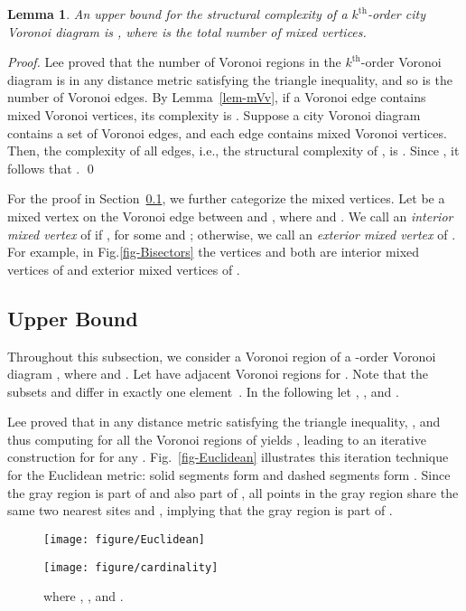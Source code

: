 \documentclass[11pt]{llncs}
\newtheorem{Lemma}{Lemma}
\newcommand{\kth}{\ensuremath{k^{\mathrm{th}}}\xspace}
\newcommand{\kthorder}{\kth-order\xspace}
\begin{document}
\newcommand{\lemmixuppertext}{An upper bound for the structural complexity of a \kthorder city Voronoi diagram 
is , where  is the total number of mixed vertices.
}

\begin{Lemma}\label{lem-mix-upper}
\lemmixuppertext
\end{Lemma}
\begin{proof}
Lee \cite{Lee-82} proved that the number of Voronoi regions in the \kthorder Voronoi diagram is 
in any distance metric satisfying the triangle inequality, and so is the number of Voronoi edges.
By Lemma~\ref{lem-mVv}, if a Voronoi edge  contains  mixed Voronoi vertices, its complexity is .
Suppose a city Voronoi diagram  contains a set  of Voronoi edges,
and each edge  contains  mixed Voronoi vertices.
Then, the complexity of all edges, i.e., the structural complexity of ,
is .
Since , it follows that
.
\qed
\end{proof}

For the proof in Section~\ref{sub-upper},
we further categorize the mixed vertices.
Let  be a mixed vertex on the Voronoi edge between  and ,
where  and .
We call   an \emph{interior mixed vertex} of 
if , for some  and ;
otherwise, we call  an \emph{exterior mixed vertex} of .
For example, in Fig.\ref{fig-Bisectors}
the vertices  and  both are interior mixed vertices of  and exterior mixed vertices of .


\subsection{Upper Bound}\label{sub-upper}
Throughout this subsection,
we consider a Voronoi region  of a -order Voronoi diagram ,
where  and .
Let  have  adjacent Voronoi regions  for .
Note that the subsets  and  differ in exactly one element~\cite{Lee-82}. In the following let
, , and .

Lee \cite{Lee-82} proved that in any distance metric satisfying the triangle inequality,
,
and thus computing  for all the Voronoi regions  of  yields ,
leading to an iterative construction for  for any .
Fig.~\ref{fig-Euclidean} illustrates this iteration technique for the Euclidean metric:
solid segments form  and dashed segments form .
Since the gray region is part of  and also part of ,
all points in the gray region share the same two nearest sites  and ,
implying that the gray region is part of .


\begin{figure}[t]
\begin{center}
\begin{minipage}[b]{0.5\textwidth}
 \centering
 \texttt{[image: figure/Euclidean]}
 \caption{
 where , , and .}
 \label{fig-Euclidean}
\end{minipage}
\hfill
\begin{minipage}[b]{0.43\textwidth}
 \centering
 \texttt{[image: figure/cardinality]}
 \caption{ where , , and .  }
 \label{fig-cardinality}
\end{minipage}
\end{center}
\end{figure}
\end{document}
